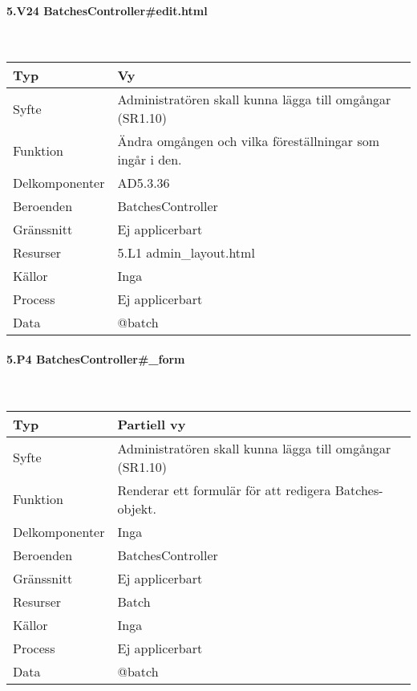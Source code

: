 \documentclass[a4paper, twoside, 11pt, titlepage]{article}
\begin{document}
			\paragraph{5.V24 BatchesController\#edit.html}\

			\begin {table} [ht] \begin{tabular} {  p{3.5cm} p{9.6cm} }
				\hline
				Typ & Vy  \\
				\hline
				Syfte & Administratören skall kunna lägga till omgångar (SR1.10)  \\
				\hline
				Funktion & Ändra omgången och vilka föreställningar som ingår i den.  \\
				\hline
				Delkomponenter & AD5.3.36  \\
				\hline
				Beroenden & BatchesController  \\
				\hline
				Gränssnitt & Ej applicerbart  \\
				\hline
				Resurser & 5.L1 admin\_layout.html  \\
				\hline
				Källor & Inga  \\
				\hline
				Process & Ej applicerbart  \\
				\hline
				Data & @batch  \\
				\hline
			\end{tabular} \end{table} \FloatBarrier


			\paragraph{5.P4 BatchesController\#\_form}\

			\begin {table} [ht] \begin{tabular} {  p{3.5cm} p{9.6cm} }
				\hline
				Typ & Partiell vy  \\
				\hline
				Syfte & Administratören skall kunna lägga till omgångar (SR1.10)  \\
				\hline
				Funktion & Renderar ett formulär för att redigera Batches-objekt.  \\
				\hline
				Delkomponenter & Inga  \\
				\hline
				Beroenden & BatchesController  \\
				\hline
				Gränssnitt & Ej applicerbart  \\
				\hline
				Resurser & Batch  \\
				\hline
				Källor & Inga  \\
				\hline
				Process & Ej applicerbart  \\
				\hline
				Data & @batch  \\
				\hline
			\end{tabular} \end{table} \FloatBarrier
\end{document}
